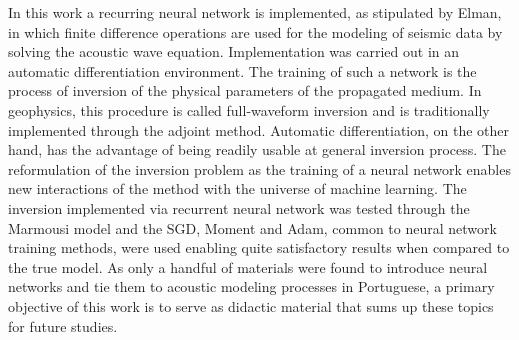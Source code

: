 
In this work a recurring neural network is implemented, as stipulated by Elman, in which finite difference operations are used for the modeling of seismic data by solving the acoustic wave equation. Implementation was carried out in an automatic differentiation environment. The training of such a network is the process of inversion of the physical parameters of the propagated medium. In geophysics, this procedure is called full-waveform inversion and is traditionally implemented through the adjoint method. Automatic differentiation, on the other hand, has the advantage of being readily usable at general inversion process. The reformulation of the inversion problem as the training of a neural network enables new interactions of the method with the universe of machine learning. The inversion implemented via recurrent neural network was tested through the Marmousi model and the SGD, Moment and Adam, common to neural network training  methods, were used enabling quite satisfactory results when compared to the true model. As only a handful of materials were found to introduce neural networks and tie them to acoustic modeling processes in Portuguese, a primary objective of this work is to serve as didactic material that sums up these topics for future studies.


% 
% 
% 
